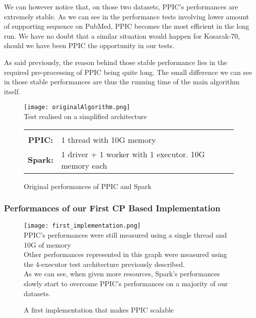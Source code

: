 \documentclass{eplmastersthesis}
\newcommand\danger{%
 \makebox[1.4em][c]{%
 \makebox[0pt][c]{\raisebox{.1em}{\small!}}%
 \makebox[0pt][c]{\color{red}\Large$\bigtriangleup$}}}%
\begin{document}
We can however notice that, on those two datasets, PPIC's performances are extremely stable. As we can see in the performance tests involving lower amount of supporting sequence on PubMed, PPIC becomes the most efficient in the long run. We have no doubt that a similar situation would happen for Kosarak-70, should we have been PPIC the opportunity in our tests. \newline

As said previously, the reason behind those stable performance lies in the required pre-processing of PPIC being quite long. The small difference we can see in those stable performances are thus the running time of the main algorithm itself.

\begin{figure}[h]
  \centering
  \texttt{[image: originalAlgorithm.png]} \\
  \danger  Test realised on a simplified architecture \danger \\
  \begin{tabular}{c l}
  	 & \\
  	\textbf{PPIC:} & 1 thread  with 10G memory \\
  	\textbf{Spark:} & 1 driver + 1 worker with 1 executor. 10G memory each
  \end{tabular}
  \caption{Original performances of PPIC and Spark}
  \label{fig:originalAlgorithmPerformances}
\end{figure}

\subsubsection{Performances of our First CP Based Implementation}

\begin{figure}[h]
  \centering
  \texttt{[image: first\_implementation.png]} \\
  \danger PPIC's performances were still measured using a single thread and 10G of memory \danger \\
  Other performances represented in this graph were measured using the 4-executor test architecture previously described. \\
  As we can see, when given more resources, Spark's performances slowly start to overcome PPIC's performances on a majority of our datasets. 
  \caption{A first implementation that makes PPIC scalable}
  \label{fig:first_scalable_CPbased_implementation}
\end{figure}
\end{document}

